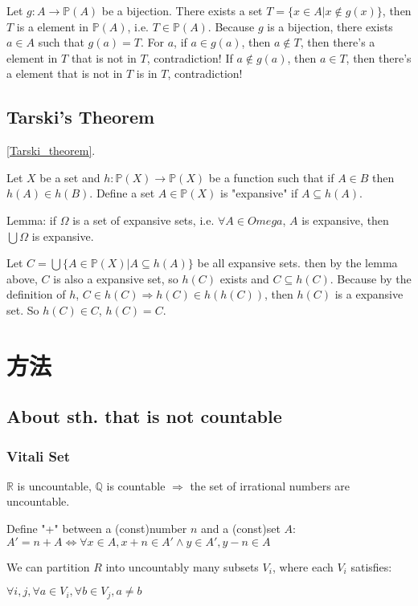 \documentclass[12pt,a4paper]{ctexrep}
\begin{document}
Let $g: A \rightarrow \mathbb{P}(A)$ be a bijection. There exists a set $T=\{x \in A| x \notin g(x)\}$, then $T$ is a element in $\mathbb{P}(A)$, i.e. $T \in \mathbb{P}(A)$. Because $g$ is a bijection, there exists $a\in A$ such that $g(a)=T$. For $a$, if $a \in g(a)$, then $a \notin T$, then there's a element in $T$ that is not in $T$, contradiction! If $a \notin g(a)$, then $a \in T$, then there's a element that is not in $T$ is in $T$, contradiction!

\subsection{Tarski's Theorem}\label{Tarski_proof}
\hyperlink{Tarski_theorem}{\ref{Tarski_theorem}}. \hypertarget{Tarski_proof}{}

Let $X$ be a set and $h: \mathbb{P}(X) \rightarrow \mathbb{P}(X)$ be a function such that if $A \in B$ then $h(A) \in h(B)$. Define a set $A \in \mathbb{P}(X)$ is "expansive" if $A \subseteq h(A)$.

Lemma: if $\Omega$ is a set of expansive sets, i.e. $\forall A \in Omega$, $A$ is expansive, then $\bigcup \Omega$ is expansive.

Let $C = \bigcup\{A\in \mathbb{P}(X)| A \subseteq h(A)\}$ be all expansive sets. then by the lemma above, $C$ is also a expansive set, so $h(C)$ exists and $C \subseteq h(C)$. Because by the definition of $h$, $C \in h(C) \Rightarrow h(C) \in h(h(C))$, then $h(C)$ is a expansive set. So $h(C) \in C$, $h(C) = C$.
\section{方法}
\subsection{About sth. that is not countable}
\subsubsection{Vitali Set}
$\mathbb{R}$ is uncountable, $\mathbb{Q}$ is countable $\Rightarrow$ the set of irrational numbers are uncountable.

Define "+" between a (const)number $n$ and a (const)set $A$: $A' = n+A \iff \forall x\in A, x+n \in A' \wedge y \in A', y-n \in A$

We can partition $R$ into uncountably many subsets $V_i$, where each $V_i$ satisfies:

$\forall i,j, \forall a\in V_i, \forall b \in V_j, a \neq b$
\end{document}
